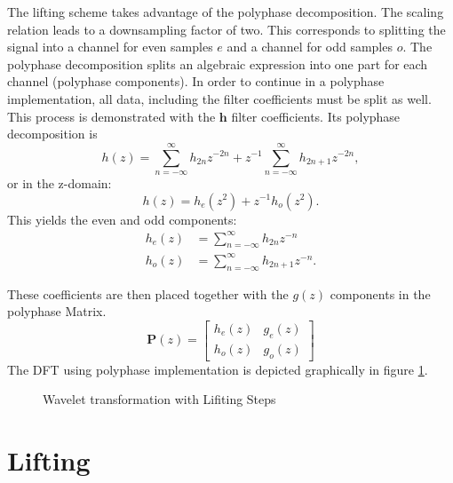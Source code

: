 \begin{refsection}
The lifting scheme takes advantage of the polyphase decomposition.
The scaling relation leads to a downsampling factor of two.
This corresponds to splitting the signal into a channel for even samples $e$ and a channel for odd samples $o$.
The polyphase decomposition splits an algebraic expression into one part for each channel (polyphase components).
In order to continue in a polyphase implementation, all data, including the filter coefficients must be split as well.
This process is demonstrated with the $\bm h$ filter coefficients.
Its polyphase decomposition is
\begin{equation}
	h(z) = \sum_{n=-\infty}^{\infty} h_{2n} z^{-2n} + z^{-1} \sum_{n=-\infty}^{\infty} h_{2n+1} z^{-2n},
\end{equation}
or in the z-domain:
\begin{equation}
	h(z)=h_{e}(z^2) + z^{-1} h_o(z^2).
\end{equation}
This yields the even and odd components:
\begin{align}
	h_e(z) &= \sum_{n=-\infty}^{\infty} h_{2n}z^{-n}
	\\
	h_o(z) &= \sum_{n=-\infty}^{\infty} h_{2n+1}z^{-n}.
\end{align}

These coefficients are then placed together with the $g(z)$ components in the polyphase Matrix.
\begin{equation}
	\bm P(z) = 
	\begin{bmatrix}
	h_e(z) & g_e(z) \\
	h_o(z) & g_o(z)
	\end{bmatrix}
\end{equation}
The DFT using polyphase implementation is depicted graphically in figure \ref{fpga:fig:liftingSteps}.
\begin{figure}
	\centering
	
	\caption{Wavelet transformation with Lifiting Steps}
	\label{fpga:fig:liftingSteps}
\end{figure}

\section{Lifting}


\end{refsection}
